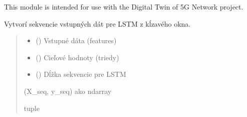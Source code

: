 \documentclass[letterpaper,10pt,english]{sphinxmanual}
\begin{document}
\sphinxAtStartPar
This module is intended for use with the Digital Twin of 5G Network project.

\begin{fulllineitems}
\label{\detokenize{lstm_preprocessing:lstm_preprocessing.create_sequences}}
\pysigstartsignatures
{}
\pysigstopsignatures
\sphinxAtStartPar
Vytvorí sekvencie vstupných dát pre LSTM z kĺzavého okna.
\begin{quote}\begin{description}
\begin{itemize}
\item {} 
\sphinxAtStartPar
{} () \textendash{} Vstupné dáta (features)

\item {} 
\sphinxAtStartPar
{} () \textendash{} Cieľové hodnoty (triedy)

\item {} 
\sphinxAtStartPar
{} () \textendash{} Dĺžka sekvencie pre LSTM

\end{itemize}

\sphinxAtStartPar
(X\_seq, y\_seq) ako ndarray

\sphinxAtStartPar
tuple

\end{description}\end{quote}

\end{fulllineitems}

\end{document}
